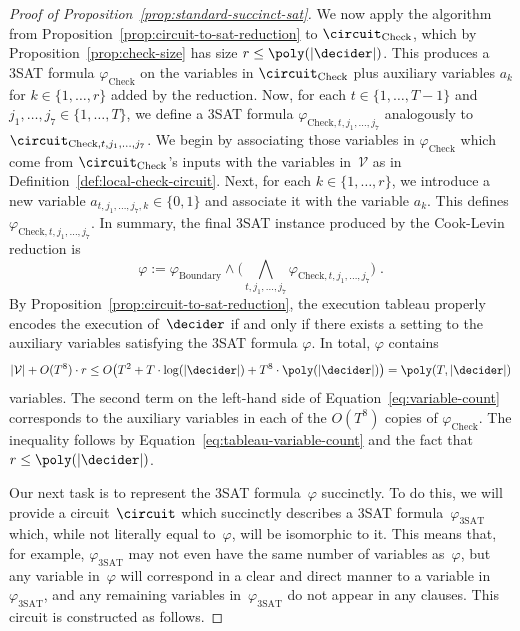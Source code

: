 \begin{proof}[Proof of Proposition~\ref{prop:standard-succinct-sat}]
We now apply the algorithm from Proposition~\ref{prop:circuit-to-sat-reduction}
to $\circuit_{\mathrm{Check}}$, which by Proposition~\ref{prop:check-size} has
size $r \leq \poly(|\decider|)$.
This produces a 3SAT formula $\varphi_{\mathrm{Check}}$ on the variables in
$\circuit_{\mathrm{Check}}$ plus auxiliary variables $a_k$ for $k \in \{1,
\ldots, r\}$ added by the reduction.
Now, for each $t \in \{1, \ldots, T-1\}$ and $j_1, \ldots, j_7 \in \{1, \ldots,
T\}$, we define a 3SAT formula $\varphi_{\mathrm{Check}, t, j_1, \ldots, j_7}$
analogously to $\circuit_{\mathrm{Check}, t, j_1, \ldots, j_7}$.
We begin by associating those variables in $\varphi_{\mathrm{Check}}$ which come
from $\circuit_{\mathrm{Check}}$'s inputs with the variables in~$\mathcal{V}$ as
in Definition~\ref{def:local-check-circuit}.
Next, for each $k \in \{1, \ldots, r\}$, we introduce a new variable $a_{t, j_1,
  \ldots, j_7, k} \in \{0, 1\}$ and associate it with the variable $a_k$.
This defines $\varphi_{\mathrm{Check}, t, j_1, \ldots, j_7}$.
In summary, the final 3SAT instance produced by the Cook-Levin reduction is
\begin{equation}\label{eq:cook-levin-3sat}
  \varphi:= \varphi_{\mathrm{Boundary}} \land \big(\bigwedge_{t, j_1, \ldots, j_7}
  \varphi_{\mathrm{Check}, t, j_1, \ldots, j_7}\big)\;.
\end{equation}
By Proposition~\ref{prop:circuit-to-sat-reduction}, the execution tableau
properly encodes the execution of~$\decider$ if and only if there exists a
setting to the auxiliary variables satisfying the 3SAT formula $\varphi$.
In total, $\varphi$ contains
\begin{equation}\label{eq:variable-count}
|\mathcal{V}| + O(T^8) \cdot r
\leq O\big(T^2 + T \cdot \log(|\decider|)
    + T^8\cdot \poly(|\decider|)\big)
 = \poly(T, |\decider|)
\end{equation}
variables.
The second term on the left-hand side of Equation~\eqref{eq:variable-count}
corresponds to the auxiliary variables in each of the $O(T^8)$ copies of
$\varphi_{\mathrm{Check}}$.
The inequality follows by Equation~\eqref{eq:tableau-variable-count} and the
fact that $r \leq \poly(|\decider|)$.
  
Our next task is to represent the 3SAT formula~$\varphi$ succinctly.
To do this, we will provide a circuit~$\circuit$ which succinctly describes a
3SAT formula~$\varphi_{\mathrm{3SAT}}$ which, while not literally equal
to~$\varphi$, will be isomorphic to it.
This means that, for example, $\varphi_{\mathrm{3SAT}}$ may not even have the
same number of variables as~$\varphi$, but any variable in~$\varphi$ will
correspond in a clear and direct manner to a variable
in~$\varphi_{\mathrm{3SAT}}$, and any remaining variables
in~$\varphi_{\mathrm{3SAT}}$ do not appear in any clauses.
This circuit is constructed as follows.


\end{proof}
